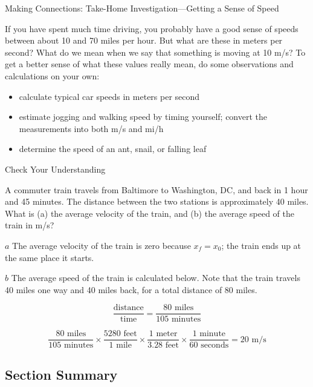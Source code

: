 \documentclass[
]{book}
\providecommand{\tightlist}{%
  \setlength{\itemsep}{0pt}\setlength{\parskip}{0pt}}
\begin{document}
\hypertarget{fs-id4030893}{}
Making Connections: Take-Home Investigation---Getting a Sense of Speed

If you have spent much time driving, you probably have a good sense of
speeds between about 10 and 70 miles per hour. But what are these in
meters per second? What do we mean when we say that something is moving
at 10 m/s? To get a better sense of what these values really mean, do
some observations and calculations on your own:

\begin{itemize}
\tightlist
\item
  \protect\hypertarget{import-auto-id4058974}{}{calculate typical car speeds in meters per
  second}
\item
  \protect\hypertarget{import-auto-id4058977}{}{estimate jogging and walking speed by timing yourself; convert the
  measurements into both m/s and mi/h}
\item
  \protect\hypertarget{import-auto-id4070923}{}{determine the speed of an ant, snail, or falling
  leaf}
\end{itemize}

\hypertarget{fs-id4173641}{}
Check Your Understanding

\leavevmode{}%
A commuter train travels from Baltimore to Washington, DC, and back in 1
hour and 45 minutes. The distance between the two stations is
approximately 40 miles. What is (a) the average velocity of the train,
and (b) the average speed of the train in m/s?

\leavevmode{}%
\(a\) The average velocity of the train is zero because
\({x_{f} = x_{0}}{}\); the train ends up at the same place it starts.

\(b\) The average speed of the train is calculated below. Note that the
train travels 40 miles one way and 40 miles back, for a total distance
of 80 miles.

\leavevmode{}%
\[{\frac{\text{distance}}{\text{time}} = \frac{\text{80\ miles}}{\text{105\ minutes}}}{}\]

\leavevmode{}%
\[{{{\frac{\text{80\ miles}}{\text{105\ minutes}} \times \frac{\text{5280\ feet}}{\text{1\ mile}}} \times \frac{\text{1\ meter}}{3\text{.}\text{28\ feet}}} \times \frac{\text{1\ minute}}{\text{60\ seconds}}} = \text{20\ m/s}\]

\hypertarget{fs-id1345097-summary}{}
\hypertarget{section-summary-2}{%
\subsection{Section Summary}\label{section-summary-2}}
\end{document}
